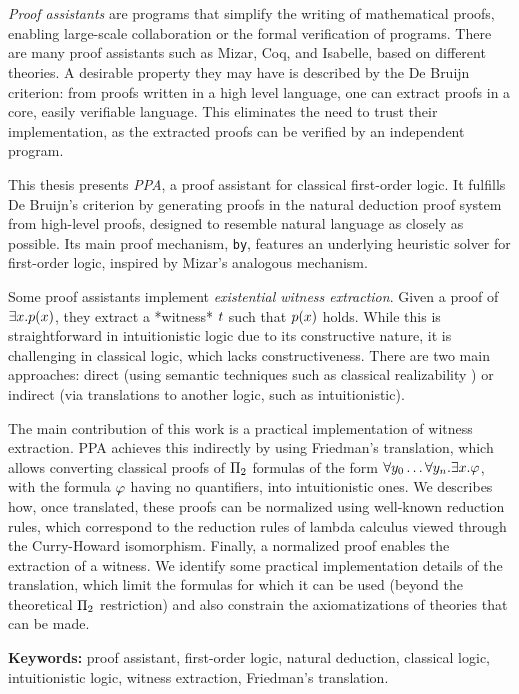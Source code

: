 \chapter*{\runtitle}

\noindent \textit{Proof assistants} are programs that simplify the writing of
mathematical proofs, enabling large-scale collaboration or the formal
verification of programs. There are many proof assistants such as Mizar, Coq,
and Isabelle, based on different theories. A desirable property they may have is
described by the De Bruijn criterion: from proofs written in a high level
language, one can extract proofs in a core, easily verifiable language. This
eliminates the need to trust their implementation, as the extracted proofs can
be verified by an independent program.

This thesis presents \textit{PPA}, a proof assistant for classical first-order logic. It fulfills De Bruijn's criterion by generating proofs in the natural deduction proof system from high-level proofs, designed to resemble natural language as closely as possible. Its main proof mechanism, \texttt{by}, features an underlying heuristic solver for first-order logic, inspired by Mizar's analogous mechanism.

Some proof assistants implement \textit{existential witness extraction}. Given a
proof of $\exists x . p(x)$, they extract a *witness* \( t \) such
that \( p(x) \) holds. While this is straightforward in intuitionistic
logic due to its constructive nature, it is challenging in classical logic,
which lacks constructiveness. There are two main approaches: direct (using
semantic techniques such as classical realizability \cite{miquel-friedman}) or indirect
(via translations to another logic, such as intuitionistic).

The main contribution of this work is a practical implementation of witness
extraction. PPA achieves this indirectly by using Friedman's translation, which
allows converting classical proofs of \( \Pi_{2} \) formulas of the form \(
\forall y_0 \dots \forall y_n . \exists x . \varphi \), with the formula
$\varphi$ having no quantifiers, into intuitionistic ones. We
describes how, once translated, these proofs can be normalized using well-known
reduction rules, which correspond to the reduction rules of lambda calculus viewed through the Curry-Howard isomorphism. Finally, a
normalized proof enables the extraction of a witness. We identify some practical
implementation details of the translation, which limit the formulas for which it
can be used (beyond the theoretical \( \Pi_{2} \) restriction) and also
constrain the axiomatizations of theories that can be made.

\bigskip

\noindent\textbf{Keywords:} proof assistant, first-order logic, natural deduction, classical logic, intuitionistic logic, witness extraction, Friedman's translation.
